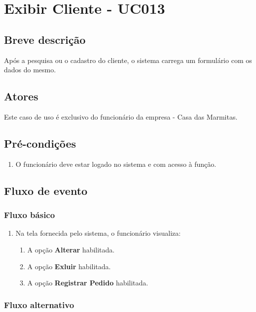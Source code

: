 \chapter{Exibir Cliente - UC013} \label{uc013}

\section{Breve descrição}

Após a pesquisa ou o cadastro do cliente, o sistema carrega um formulário com os dados do mesmo.

\section{Atores}

Este caso de uso é exclusivo do funcionário da empresa - Casa das Marmitas.

\section{Pré-condições}

\begin{enumerate}
	\item O funcionário deve estar logado no sistema e com acesso à função.
\end{enumerate}

\section{Fluxo de evento}

\subsection{Fluxo básico}

\begin{enumerate}
	\item Na tela fornecida pelo sistema, o funcionário visualiza:
	\begin{enumerate}
		\item A opção \textbf{Alterar} habilitada.
		\item A opção \textbf{Exluir} habilitada.
		\item A opção \textbf{Registrar Pedido} habilitada.
	\end{enumerate}		
\end{enumerate}

\subsection{Fluxo alternativo}

